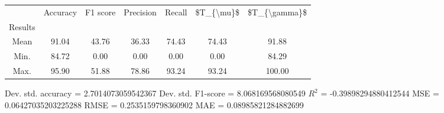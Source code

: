 \begin{tabular}{|c|c|c|c|c|c|c|}
\toprule
{} &  Accuracy &  F1 score &  Precision &  Recall &  \$T\_\{\textbackslash mu\}\$ &  \$T\_\{\textbackslash gamma\}\$ \\
Results &           &           &            &         &            &               \\
\hline
Mean    &     91.04 &     43.76 &      36.33 &   74.43 &      74.43 &         91.88 \\
Min.    &     84.72 &      0.00 &       0.00 &    0.00 &       0.00 &         84.29 \\
Max.    &     95.90 &     51.88 &      78.86 &   93.24 &      93.24 &        100.00 \\
\bottomrule
\end{tabular}

 Dev. std. accuracy = 2.7014073059542367
 Dev. std. F1-score = 8.068169568080549
 $R^2$ = -0.39898294880412544
 MSE = 0.06427035203225288
 RMSE = 0.2535159798360902
 MAE = 0.08985821284882699